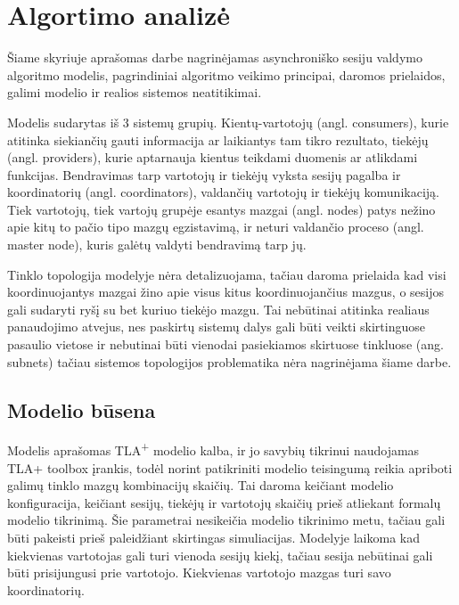 \section{Algortimo analizė}

Šiame skyriuje aprašomas darbe nagrinėjamas asynchroniško sesiju valdymo algoritmo \cite{petrauskas2018asynchronous} modelis, pagrindiniai algoritmo veikimo principai, daromos prielaidos, galimi
modelio ir realios sistemos neatitikimai.

Modelis sudarytas iš 3 sistemų grupių. Kientų-vartotojų (angl. consumers), 
 kurie atitinka siekiančių gauti informacija ar laikiantys tam tikro rezultato, 
 tiekėjų (angl. providers), kurie aptarnauja kientus teikdami duomenis ar atlikdami funkcijas. 
Bendravimas tarp vartotojų ir tiekėjų vyksta sesijų pagalba ir koordinatorių (angl. coordinators), 
 valdančių vartotojų ir tiekėjų komunikaciją. 
Tiek vartotojų, tiek vartojų grupėje esantys mazgai (angl. nodes) patys nežino 
 apie kitų to pačio tipo mazgų egzistavimą, ir neturi valdančio proceso (angl. master node), 
 kuris galėtų valdyti bendravimą tarp jų.

Tinklo topologija modelyje nėra detalizuojama,
 tačiau daroma prielaida kad visi koordinuojantys mazgai žino apie visus kitus koordinuojančius mazgus,
 o sesijos gali sudaryti ryšį su bet kuriuo tiekėjo mazgu.
Tai nebūtinai atitinka realiaus panaudojimo atvejus, 
 nes paskirtų sistemų dalys gali būti veikti skirtinguose pasaulio vietose 
 ir nebutinai būti vienodai pasiekiamos skirtuose tinkluose (ang. subnets)
 tačiau sistemos topologijos problematika nėra nagrinėjama šiame darbe.


\subsection{Modelio būsena}

Modelis aprašomas TLA\textsuperscript{+} modelio kalba, 
 ir jo savybių tikrinui naudojamas TLA+ toolbox įrankis,
 todėl norint patikriniti modelio teisingumą reikia apriboti galimų tinklo mazgų kombinacijų skaičių. 
Tai daroma keičiant modelio konfiguracija, keičiant sesijų, tiekėjų ir vartotojų skaičių 
 prieš atliekant formalų modelio tikrinimą. 
Šie parametrai nesikeičia modelio tikrinimo metu,
 tačiau gali būti pakeisti prieš paleidžiant skirtingas simuliacijas.  
Modelyje laikoma kad kiekvienas vartotojas gali turi vienoda sesijų kiekį,
 tačiau sesija nebūtinai gali būti prisijungusi prie vartotojo.
Kiekvienas vartotojo mazgas turi savo koordinatorių.


